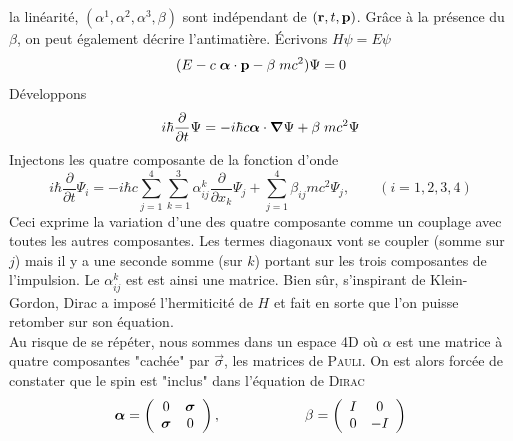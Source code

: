 la linéarité, $(\alpha^1, \alpha^2, \alpha^3, \beta)$ sont indépendant de $({\bf r},t,{\bf p})$. Grâce
à la présence du $\beta$, on peut également décrire l'antimatière. Écrivons $H\psi = E\psi$
\begin{equation}
(E - c \; \mbox{\boldmath $ \alpha $} \cdot {\bf p}
  - \beta \; mc^2 ) \Psi = 0
\end{equation}
Développons
\begin{equation}
i \hbar \frac{\partial}{\partial t} \Psi =
- i \hbar  c \mbox{\boldmath $ \alpha $} \cdot \mbox{\boldmath $ \nabla $} \Psi +  \beta \; mc^2  \Psi
\end{equation}
Injectons les quatre composante de la fonction d'onde
\begin{equation}
i \hbar \frac{\partial}{\partial t} \Psi_i = -i \hbar c 
\sum_{j=1}^4 \sum_{k=1}^3 \alpha_{ij}^k 
\frac{\partial}{\partial x_k} \Psi_j 
+ \sum_{j=1}^4 \beta_{ij} mc^2 \Psi_j,\qquad (i=1,2,3,4)
\end{equation}
Ceci exprime la variation d'une des quatre composante comme un couplage avec toutes les autres 
composantes. Les termes diagonaux vont se coupler (somme sur $j$) mais il y a une seconde somme
(sur $k$) portant sur les trois composantes de l'impulsion. Le $\alpha^k_{ij}$ est est ainsi une 
matrice. Bien sûr, s'inspirant de Klein-Gordon, Dirac a imposé l'hermiticité de $H$ et fait en sorte
que l'on puisse retomber sur son équation.\\

Au risque de se répéter, nous sommes dans un espace 4D où $\alpha$ est une matrice à quatre 
composantes "cachée" par $\vec \sigma$, les matrices de \textsc{Pauli}. On est alors forcée de 
constater que le spin est "inclus" dans l'équation de \textsc{Dirac}
\begin{equation}
\mbox{\boldmath $ \alpha $} = 
\left( \begin{array}{cc} 0 & \mbox{\boldmath $ \sigma $} \\
\mbox{\boldmath $ \sigma $} & 0 \end{array} \right),\qquad\qquad\qquad
\beta = 
\left( 
\begin{array}{cc} I & 0 \\
0 & - I    \end{array} \right)
\end{equation}


